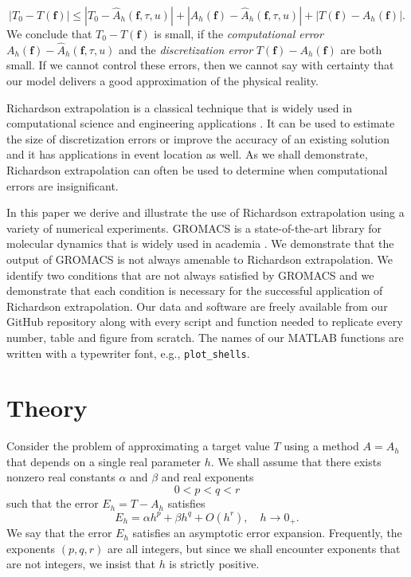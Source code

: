 \documentclass[runningheads]{llncs}
\begin{document}
\begin{equation}
  |T_0 - T(\bm{f}) | \leq  |T_0 - \hat{A}_h(\bm{f},\tau,u)| + |A_h(\bm{f}) - \hat{A}_h(\bm{f},\tau,u)| + |T(\bm{f}) - A_h(\bm{f})|.
\end{equation}
We conclude that $T_0 - T(\bm{f})$ is small, if the \emph{computational error} $A_h(\bm{f}) - \hat{A}_h(\bm{f}, \tau, u)$ and the \emph{discretization error} $T(\bm{f}) - A_h(\bm{f})$ are both small. If we cannot control these errors, then we cannot say with certainty that our model delivers a good approximation of the physical reality.

Richardson extrapolation is a classical technique that is widely used in computational science and engineering applications \cite{roache1998}. It can be used to estimate the size of discretization errors or improve the accuracy of an existing solution \cite{zahari2018} and it has applications in event location \cite{mannshardt1978one} as well. As we shall demonstrate, Richardson extrapolation can often be used to determine when computational errors are insignificant.

In this paper we derive and illustrate the use of Richardson extrapolation using a variety of numerical experiments.
GROMACS is a state-of-the-art library for molecular dynamics that is widely used in academia \cite{gromacs2005}.
We demonstrate that the output of GROMACS is not always amenable to Richardson extrapolation. 
We identify two conditions that are not always satisfied by GROMACS and we demonstrate that each condition is necessary for the successful application of Richardson extrapolation.
Our data and software are freely available from our GitHub \cite{spockcc2024ppam} repository along with every script and function needed to replicate every number, table and figure from scratch. The names of our MATLAB functions are written with a typewriter font, e.g., \texttt{plot\_shells}.

\section{Theory}

Consider the problem of approximating a target value $T$ using a method $A = A_h$ that depends on a single real parameter $h$. We shall assume that there exists nonzero real constants $\alpha$ and $\beta$ and real exponents
\begin{equation}
  0 < p < q < r
\end{equation}
such that the error $E_h = T - A_h$ satisfies
\begin{equation} \label{equ:aex}
  E_h  = \alpha h^p + \beta h^q + O(h^r), \quad h \rightarrow 0_+.
\end{equation}
We say that the error $E_h$ satisfies an asymptotic error expansion. Frequently, the exponents $(p,q,r)$ are all integers, but since we shall encounter exponents that are not integers, we insist that $h$ is strictly positive.
\end{document}
